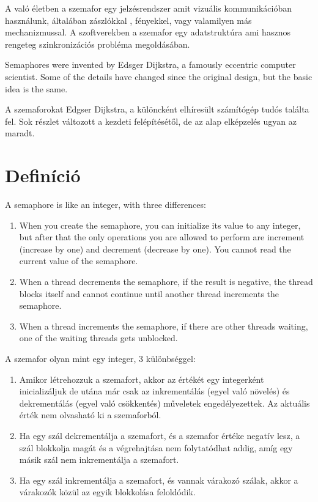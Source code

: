 \documentclass{book}
\begin{document}
A való életben a szemafor egy jelzésrendszer amit vizuális kommunikációban
használunk, általában zászlókkal , fényekkel, vagy valamilyen más mechanizmussal.
A szoftverekben a szemafor egy adatstruktúra ami hasznos rengeteg
szinkronizációs probléma megoldásában.

Semaphores were invented by Edsger Dijkstra, a famously eccentric
computer scientist.  Some of the details have changed since the
original design, but the basic idea is the same.

A szemaforokat Edgser Dijkstra,
a különcként elhíresült számítógép tudós találta fel. Sok részlet
változott a kezdeti felépítését\H{o}l, de az alap elképzelés ugyan
az maradt.

\section{Definíció}

A semaphore is like an integer, with three differences:

\begin{enumerate}

\item When you create the semaphore, you can initialize its value to
any integer, but after that the only operations you are allowed to
perform are increment (increase by one) and decrement (decrease by
one).  You cannot read the current value of the semaphore.

\item When a thread decrements the semaphore, if the result is
negative, the thread blocks itself and cannot continue until another
thread increments the semaphore.

\item When a thread increments the semaphore, if there are other
threads waiting, one of the waiting threads gets unblocked.

\end{enumerate}

A szemafor olyan mint egy integer, 3 különbséggel:

\begin{enumerate}

\item Amikor létrehozzuk a szemafort, akkor az értékét egy integerként inicializáljuk
de utána már csak az inkrementálás (egyel való növelés) és dekrementálás
(egyel való csökkentés) műveletek engedélyezettek. Az aktuális
érték nem olvasható ki a szemaforból.

\item Ha egy szál dekrementálja a szemafort, és a szemafor
értéke negatív lesz, a szál blokkolja magát és a végrehajtása nem
folytatódhat addig, amíg egy másik szál nem inkrementálja a szemafort.

\item Ha egy szál inkrementálja a szemafort, és vannak várakozó szálak, akkor a várakozók
közül az egyik blokkolása feloldódik.

\end{enumerate}
\end{document}

